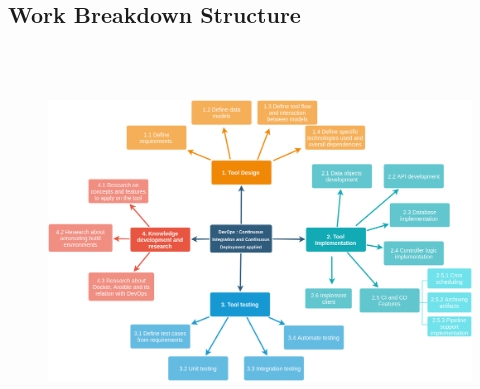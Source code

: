 \documentclass[a4paper]{article}
\begin{document}
\subsection{Work Breakdown Structure}
~\\~\\
\begin{figure}[h]
	\includegraphics[scale=0.4]{wp_breakdown}
\end{figure}
\newpage
\end{document}
